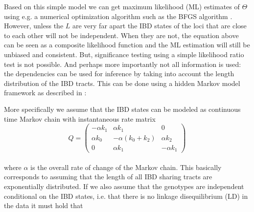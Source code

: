 \documentclass[a4paper, 11pt]{article}
\begin{document}
\noindent
Based on this simple model we can get maximum likelihood (ML) estimates of $\Theta$ using e.g. a numerical optimization algorithm such as the BFGS
algorithm \cite{Byrd95}. 	
However, unless the $L$ are very far apart the IBD states of the loci that are close to each other will not be independent. When they are not, 
the equation above can be seen as a composite likelihood function and the ML estimation will still be unbiased and consistent. But, significance testing using a simple likelihood ratio test is not possible. And perhaps more importantly not all information is used:
the dependencies can be used for inference by taking into account the length distribution of the IBD tracts. This can be done using a hidden Markov model framework as described in \cite{Albrechtsen09}: 

More specifically we assume that the IBD states can be modeled as continuous time Markov chain with instantaneous rate matrix\\
\small
\[ Q = \left( \begin{array}{ccc}
-\alpha k_1& \alpha k_1 & 0 \\
\alpha k_0 & -\alpha (k_0+k_2) & \alpha k_2 \\
0 & \alpha k_1 & -\alpha k_1 \end{array} \right)\] \\
where $\alpha$ is the overall rate of change of the Markov chain.
\normalsize
This basically corresponds to assuming that the length of all IBD sharing tracts are  exponentially distributed. 
If we also assume that the genotypes are independent conditional on the IBD states, i.e. that there is no linkage disequilibrium (LD) in the data it must hold that
\end{document}
